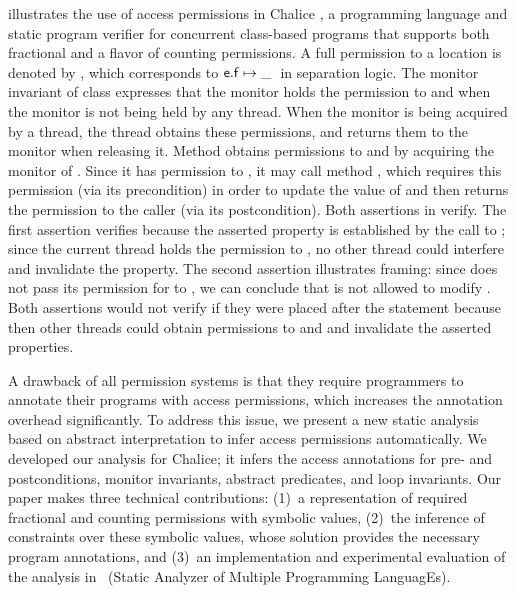 \documentclass{llncs}
\begin{document}
 illustrates the use of access
permissions in Chalice \cite{LM09,LMS09}, a programming language and static
program verifier for concurrent class-based programs that supports
both fractional and a flavor of counting permissions. A full
permission to a location  is denoted by
, which corresponds to
$\mathsf{e.f}\mapsto\_\;$ in separation logic.  The monitor
invariant of class  expresses that the monitor holds
the permission to  and  when the
monitor is not being held by any thread. When the monitor is being
acquired by a thread, the thread obtains these permissions, and returns
them to the monitor when releasing it. Method 
obtains permissions to  and  by
acquiring the monitor of . Since it has permission to
, it may call method , which requires
this permission (via its precondition) in order to update the value of
 and then returns the permission to the caller (via its
postcondition). Both assertions in  verify. The
first assertion verifies because the asserted property is established by the
call to ; since the current thread holds the
permission to , no other thread could interfere and
invalidate the property. The second assertion illustrates framing:
since  does not pass its permission for 
to , we can conclude that  is not
allowed to modify . Both assertions would not verify if they
were placed after the  statement because then other
threads could obtain permissions to  and 
and invalidate the asserted properties.

A drawback of all permission systems is that they require programmers
to annotate their programs with access permissions, which increases
the annotation overhead significantly. To address this issue, we
present a new static analysis based on abstract interpretation to
infer access permissions automatically.  We developed our analysis for
Chalice; it infers the access annotations for pre- and postconditions,
monitor invariants, abstract predicates, and loop invariants. Our
paper makes three technical contributions: (1)~a representation of
required fractional and counting permissions with symbolic values,
(2)~the inference of constraints over these symbolic values, whose
solution provides the necessary program annotations, and (3)~an
implementation and experimental evaluation of the analysis in
\Sample\ (Static Analyzer of Multiple Programming LanguagEs).
\end{document}

